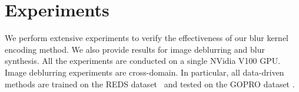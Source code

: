 \documentclass[final]{cvpr}
\newcommand{\Sref}[1]{Sec.~\ref{#1}}
\newcommand{\Eref}[1]{Eq.~(\ref{#1})}
\begin{document}



\section{Experiments}
We perform extensive experiments to verify the effectiveness of our blur kernel encoding method. We also provide results for image deblurring and blur synthesis. All the experiments are conducted on a single NVidia V100 GPU. Image deblurring experiments are cross-domain. In particular, all data-driven methods are trained on the REDS dataset~\cite{nah2019ntire} and tested on the GOPRO dataset \cite{nah2017deep}.
\end{document}
